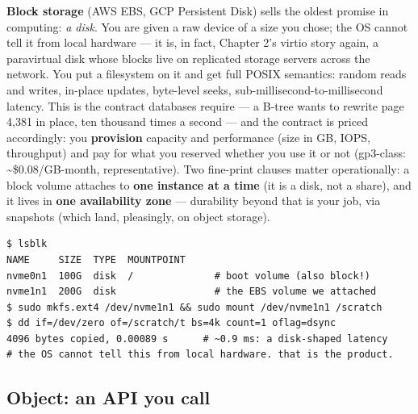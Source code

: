 \textbf{Block storage} (AWS EBS, GCP Persistent Disk) sells the oldest promise in computing: \textit{a disk}. You are given a raw device of a size you chose; the OS cannot tell it from local hardware — it is, in fact, Chapter 2's virtio story again, a paravirtual disk whose blocks live on replicated storage servers across the network. You put a filesystem on it and get full POSIX semantics: random reads and writes, in-place updates, byte-level seeks, sub-millisecond-to-millisecond latency. This is the contract databases require — a B-tree wants to rewrite page 4,381 in place, ten thousand times a second — and the contract is priced accordingly: you \textbf{provision} capacity and performance (size in GB, IOPS, throughput) and pay for what you reserved whether you use it or not (gp3-class: \textasciitilde{}\$0.08/GB-month, representative). Two fine-print clauses matter operationally: a block volume attaches to \textbf{one instance at a time} (it is a disk, not a share), and it lives in \textbf{one availability zone} — durability beyond that is your job, via snapshots (which land, pleasingly, on object storage).

\begin{terminalbox}
\begin{Verbatim}[breaklines=true,breakanywhere=true,fontsize=\small,formatcom=\color{tbbtermfg},codes=\tbbcodeactive]
$ lsblk
NAME     SIZE  TYPE  MOUNTPOINT
nvme0n1  100G  disk  /              # boot volume (also block!)
nvme1n1  200G  disk                 # the EBS volume we attached
$ sudo mkfs.ext4 /dev/nvme1n1 && sudo mount /dev/nvme1n1 /scratch
$ dd if=/dev/zero of=/scratch/t bs=4k count=1 oflag=dsync
4096 bytes copied, 0.00089 s      # ~0.9 ms: a disk-shaped latency
# the OS cannot tell this from local hardware. that is the product.
\end{Verbatim}
\end{terminalbox}

\subsection*{Object: an API you call}

